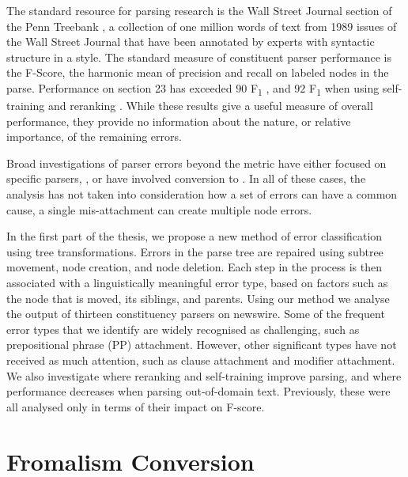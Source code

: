 The standard resource for parsing research is the Wall Street Journal section of the Penn Treebank \parencite{ptb}, a collection of one million words of text from 1989 issues of the Wall Street Journal that have been annotated by experts with syntactic structure in a \gb style.
The standard measure of constituent parser performance is the F-Score, the harmonic mean of precision and recall on labeled nodes in the parse.
Performance on \wsj section 23 has exceeded $90$ F\textsubscript{1} \parencite{Petrov-Klein:2007}, and $92$ F\textsubscript{1} when using self-training and reranking \parencite{McClosky-Charniak-Johnson:2006,Charniak-Johnson:2005}. 
While these results give a useful measure of overall performance, they provide no information about the nature, or relative importance, of the remaining errors.

Broad investigations of parser errors beyond the \parseval metric \parencite{Black-etal:1991} have either focused on specific parsers, \myeg \parencite{Collins:2003}, or have involved conversion to \depgr \parencite{Carroll-etal:1998,King:2003}.
In all of these cases, the analysis has not taken into consideration how a set of errors can have a common cause, \myeg a single mis-attachment can create multiple node errors.

In the first part of the thesis, we propose a new method of error classification using tree transformations.
Errors in the parse tree are repaired using subtree movement, node creation, and node deletion.
Each step in the process is then associated with a linguistically meaningful error type, based on factors such as the node that is moved, its siblings, and parents.  
Using our method we analyse the output of thirteen constituency parsers on newswire.
Some of the frequent error types that we identify are widely recognised as challenging, such as prepositional phrase (PP) attachment.
However, other significant types have not received as much attention, such as clause attachment and modifier attachment.
We also investigate where reranking and self-training improve parsing, and where performance decreases when parsing out-of-domain text.
Previously, these were all analysed only in terms of their impact on F-score.

\section{Fromalism Conversion}

